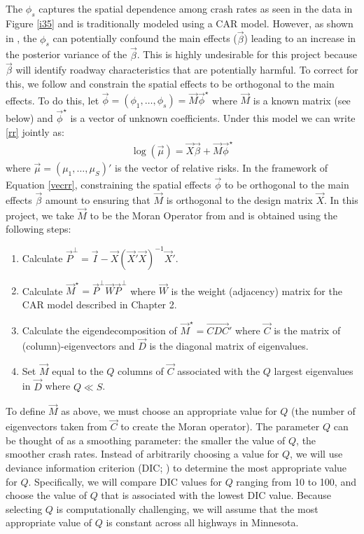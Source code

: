 The $\phi_s$ captures the spatial dependence among crash rates as seen in the data in Figure \ref{i35} and is traditionally modeled using a CAR model. However,  as shown in \citet{hughes12}, the $\phi_s$ can potentially confound the main effects ($\vec{\beta}$) leading to an increase in the posterior variance of the $\vec{\beta}$.  This is highly undesirable for this project because $\vec{\beta}$ will identify roadway characteristics that are potentially harmful. To correct for this, we follow \citet{hughes12} and constrain the spatial effects to be orthogonal to the main effects. To do this, let $\vec{\phi} = (\phi_1,\dots,\phi_s) = \vec{M} \vec{\phi}^\star$ where $\vec{M}$ is a known matrix (see below) and $\vec{\phi}^\star$ is a vector of unknown coefficients.  Under this model we can write \eqref{rr} jointly as:
\begin{align}
\log(\vec{\mu}) = \vec{X}\vec{\beta} + \vec{M}\vec{ \phi}^\star
\label{vecrr}
\end{align}
where $\vec{\mu} = (\mu_1,\dots,\mu_S)'$ is the vector of relative risks.  In the framework of Equation \eqref{vecrr}, constraining the spatial effects $\vec{\phi}$ to be orthogonal to the main effects $\vec{\beta}$ amount to ensuring that $\vec{M}$ is orthogonal to the design matrix $\vec{X}$.  In this project, we take $\vec{M}$ to be the Moran Operator from \citet{hughes12} and is obtained using the following steps:
\begin{enumerate}
\item Calculate $\vec{P}^\perp = \vec{I} - \vec{X}(\vec{X}'\vec{X})^{-1}\vec{X}'$.
\item Calculate $\vec{M}^\star =  \vec{P}^\perp \vec{W} \vec{P}^\perp $ where $\vec{W}$ is the weight (adjacency) matrix for the CAR model described in Chapter 2.
\item Calculate the eigendecomposition of $\vec{M}^\star = \vec{CDC}'$ where $\vec{C}$ is the matrix of (column)-eigenvectors and $\vec{D}$ is the diagonal matrix of eigenvalues.
\item Set $\vec{M}$ equal to the $Q$ columns of $\vec{C}$ associated with the $Q$ largest eigenvalues in $\vec{D}$ where $Q \ll S$.
\end{enumerate}

To define $\vec{M}$ as above, we must choose an appropriate value for $Q$ (the number of eigenvectors taken from $\vec{C}$ to create the Moran operator). The parameter $Q$ can be thought of as a smoothing parameter: the smaller the value of $Q$, the smoother crash rates. Instead of arbitrarily choosing a value for $Q$, we will use deviance information criterion (DIC; \citealt{spiegelhalter02}) to determine the most appropriate value for $Q$. Specifically, we will compare DIC values for $Q$ ranging from 10 to 100, and choose the value of $Q$ that is associated with the lowest DIC value. Because selecting $Q$ is computationally challenging, we will assume that the most appropriate value of $Q$ is constant across all highways in Minnesota.

